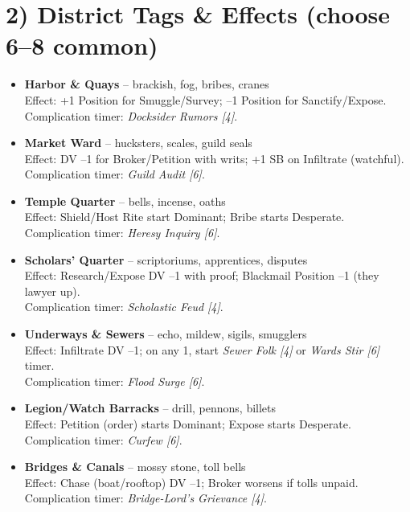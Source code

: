 \documentclass[11pt]{article}
\begin{document}
\section*{2) District Tags \& Effects (choose 6--8 common)}
\begin{itemize}
    \item \textbf{Harbor \& Quays} -- brackish, fog, bribes, cranes \\
    Effect: +1 Position for Smuggle/Survey; --1 Position for Sanctify/Expose. \\
    Complication timer: \textit{Docksider Rumors [4]}.
    
    \item \textbf{Market Ward} -- hucksters, scales, guild seals \\
    Effect: DV --1 for Broker/Petition with writs; +1 SB on Infiltrate (watchful). \\
    Complication timer: \textit{Guild Audit [6]}.
    
    \item \textbf{Temple Quarter} -- bells, incense, oaths \\
    Effect: Shield/Host Rite start Dominant; Bribe starts Desperate. \\
    Complication timer: \textit{Heresy Inquiry [6]}.
    
    \item \textbf{Scholars' Quarter} -- scriptoriums, apprentices, disputes \\
    Effect: Research/Expose DV --1 with proof; Blackmail Position --1 (they lawyer up). \\
    Complication timer: \textit{Scholastic Feud [4]}.
    
    \item \textbf{Underways \& Sewers} -- echo, mildew, sigils, smugglers \\
    Effect: Infiltrate DV --1; on any 1, start \textit{Sewer Folk [4]} or \textit{Wards Stir [6]} timer. \\
    Complication timer: \textit{Flood Surge [6]}.
    
    \item \textbf{Legion/Watch Barracks} -- drill, pennons, billets \\
    Effect: Petition (order) starts Dominant; Expose starts Desperate. \\
    Complication timer: \textit{Curfew [6]}.
    
    \item \textbf{Bridges \& Canals} -- mossy stone, toll bells \\
    Effect: Chase (boat/rooftop) DV --1; Broker worsens if tolls unpaid. \\
    Complication timer: \textit{Bridge-Lord's Grievance [4]}.
    

\end{itemize}
\end{document}

